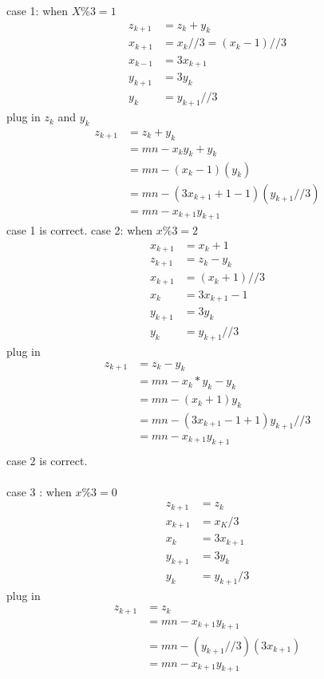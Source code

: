 \documentclass[12pt]{article}
\begin{document}
\begin{enumerate}
case 1: when $X\%3 = 1$
\begin{align*}
    z_{k+1}&=z_k + y_k\\
    x_{k+1}&= x_k// 3 = (x_k-1) // 3 \\
    x_{k-1}&=3x_{k+1}\\
    y_{k+1}&=3y_k\\
    y_k&=y_{k+1}//3
\end{align*}
plug in $z_k$ and $y_k$
\begin{align*}
    z_{k+1}&=z_k + y_k\\
    &=mn-x_ky_k + y_k\\
    &=mn-(x_k - 1)(y_k)\\
    &=mn-(3x_{k+1}+1-1)(y_{k+1}//3)\\
    &=mn-x_{k+1}y_{k+1}
\end{align*}
case 1 is correct.
\newpage
case 2: when $x\% 3 = 2$
\begin{align*}
    x_{k+1} &= x_k + 1\\
    z_{k+1}&=z_k-y_k\\
    x_{k+1} &= (x_k+1)//3\\
    x_k&=3x_{k+1}-1\\
    y_{k+1}&= 3y_k\\
    y_k&= y_{k+1}//3
\end{align*}
plug in
\begin{align*}
    z_{k+1}&=z_k-y_k\\
    &=mn-x_k*y_k-y_k\\
    &=mn-(x_k + 1)y_k\\
    &=mn-(3x_{k+1}-1+1)y_{k+1}//3\\
    &=mn-x_{k+1}y_{k+1}\\
\end{align*}
case 2 is correct.\\\\
case 3 : when $x\%3 = 0$
\begin{align*}
    z_{k+1}&=z_k\\
    x_{k+1}&=x_K/3\\
    x_k&=3x_{k+1}\\
    y_{k+1}&=3y_k\\
    y_k&=y_{k+1}/3
\end{align*}
plug in
\begin{align*}
    z_{k+1}&=z_k\\
    &=mn-x_{k+1}y_{k+1}\\
    &=mn-(y_{k+1}//3)(3x_{k+1})\\
    &=mn-x_{k+1}y_{k+1}
\end{align*}

\end{enumerate}
\end{document}
